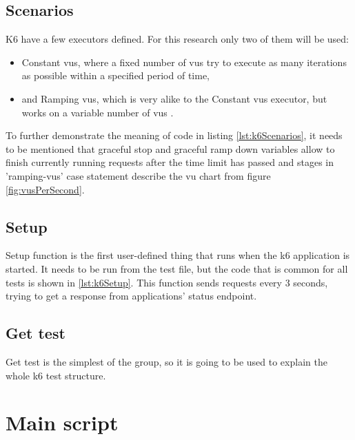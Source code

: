 \subsection{Scenarios}
K6 have a few executors defined. For this research only two of them will be used:
\begin{itemize}
    \item Constant \acrshort{vu}s, where a fixed number of \acrlong{vu}s try to execute as many iterations as possible within a specified period of time,
    \item and Ramping \acrshort{vu}s, which is very alike to the Constant \acrshort{vu}s executor, but works on a variable number of \acrlong{vu}s \cite{k6Executors}.
\end{itemize}
To further demonstrate the meaning of code in listing \ref{lst:k6Scenarios}, it needs to be mentioned that graceful stop and graceful ramp down variables allow to finish currently running requests after the time limit has passed and stages in 'ramping-vus' case statement describe the \acrshort{vu} chart from figure \ref{fig:vusPerSecond}.


\subsection{Setup}
Setup function is the first user-defined thing that runs when the k6 application is started. It needs to be run from the test file, but the code that is common for all tests is shown in \ref{lst:k6Setup}. This function sends requests every 3 seconds, trying to get a response from applications' status endpoint.


\subsection{Get test}
Get test is the simplest of the group, so it is going to be used to explain the whole k6 test structure.

%
%
\section{Main script}

